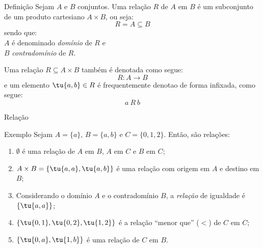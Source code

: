 
\frame{\maketitle}


\section{\inserttitle}

\begin{frame}{\inserttitle}
\small
  \begin{block}{Definição}
    Sejam $A$ e $B$ conjuntos. Uma \alert{relação} $R$ de $A$ em $B$ é
    um subconjunto de um produto cartesiano $A\times B$, ou seja:
    \[R=A\subseteq B\]
    \noindent sendo que:\\
    \noindent $A$ é denominado \emph{domínio} de $R$ e\\
    \noindent $B$ \emph{contradomínio} de $R$.
  \end{block}
  \bigskip{}
Uma relação $R\subseteq A\times B$ também é denotada como segue:
\[ R:A\rightarrow B\]
\noindent e um elemento $\tu{a,b}\in R$ é frequentemente denotao de
forma infixada, como segue:
\[a\ R\ b\]

\end{frame}

\begin{frame}{Relação}
  
  \begin{block}{Exemplo}
    Sejam $A=\{a\}$, $B=\{a,b\}$ e $C=\{0,1,2\}$. Então, são relações:
    \begin{enumerate}[<+-| alert@+>]
    \item $\emptyset$ é uma relação de $A$ em $B$, $A$ em $C$ e $B$ em $C$;
    \item $A\times B=\{\tu{a,a},\tu{a,b}\}$ é uma relação com origem
      em $A$ e destino em $B$;
    \item Considerando o domínio $A$ e o contradomínio $B$, a
      \emph{relação} de igualdade é $\{\tu{a,a}\}$;
    \item $\{\tu{0,1}, \tu{0,2}, \tu{1,2}\}$ é a relação ``menor que''
      ($<$) de $C$ em $C$;
    \item $\{\tu{0,a},\tu{1,b}\}$ é uma relação de $C$ em $B$.
    \end{enumerate}
  \end{block}

\end{frame}

